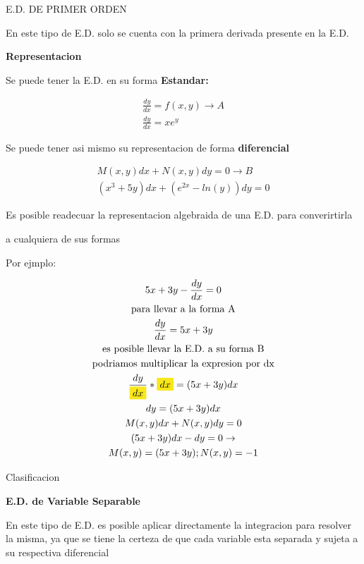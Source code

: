 \documentclass{article}
\begin{document}
E.D. DE PRIMER ORDEN 

En este tipo de E.D. solo se cuenta con la primera derivada presente en la E.D.

\textbf{Representacion}

Se puede tener la E.D. en su forma \colorbox[RGB]{248,231,28}{\textbf{Estandar:}}


\begin{gather*}
\frac{dy}{dx} = f(x,y)  \rightarrow  A \\
\frac{dy}{dx} = xe^{y}
\end{gather*}


Se puede tener asi mismo su representacion de forma \colorbox[RGB]{248,231,28}{\textbf{diferencial}}


\begin{gather*}
M(x,y)dx + N(x,y)dy = 0  \rightarrow  B \\
(x^{3}+5y)dx+(e^{2x}-ln(y))dy = 0
\end{gather*}


Es posible readecuar la representacion algebraida de una E.D. para converirtirla

a cualquiera de sus formas

Por ejmplo:  


\begin{gather*}
5x+3y-\frac{dy}{dx} = 0 \\
\text{para llevar a la forma A} \\
\frac{dy}{dx} = 5x+3y \\
\text{es posible llevar la E.D. a su forma B} \\
\text{podriamos multiplicar la expresion por dx} \\
\frac{dy}{\text{\colorbox[RGB]{248,231,28}{$dx$}}}*\text{\colorbox[RGB]{248,231,28}{$dx$}} = (5x+3y)dx \\
dy = (5x+3y)dx \\
M(x,y)dx + N(x,y)dy = 0 \\
(5x+3y)dx-dy = 0   \rightarrow  \\
M(x,y) =(5x+3y); N(x,y) = -1
\end{gather*}




Clasificacion

\textbf{E.D. de Variable Separable}

En este tipo de E.D. es posible aplicar directamente la integracion para resolver la misma, ya que se tiene la certeza de que cada variable esta separada y sujeta a su respectiva diferencial
\end{document}
